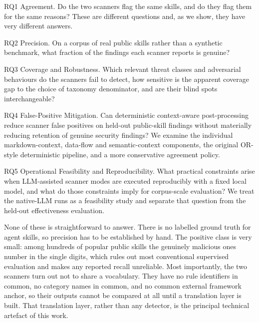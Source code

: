 \documentclass[conference]{IEEEtran}
\begin{document}
RQ1 Agreement. Do the two scanners flag the same skills, and do they flag them for the same reasons? These are different questions and, as we show, they have very different answers.

RQ2 Precision. On a corpus of real public skills rather than a synthetic benchmark, what fraction of the findings each scanner reports is genuine?

RQ3 Coverage and Robustness. Which relevant threat classes and adversarial behaviours do the scanners fail to detect, how sensitive is the apparent coverage gap to the choice of taxonomy denominator, and are their blind spots interchangeable?

RQ4 False-Positive Mitigation. Can deterministic context-aware post-processing reduce scanner false positives on held-out public-skill findings without materially reducing retention of genuine security findings? We examine the individual markdown-context, data-flow and semantic-context components, the original OR-style deterministic pipeline, and a more conservative agreement policy.

RQ5 Operational Feasibility and Reproducibility. What practical constraints arise when LLM-assisted scanner modes are executed reproducibly with a fixed local model, and what do those constraints imply for corpus-scale evaluation? We treat the native-LLM runs as a feasibility study and separate that question from the held-out effectiveness evaluation.

None of these is straightforward to answer. There is no labelled ground truth for agent skills, so precision has to be established by hand. The positive class is very small: among hundreds of popular public skills the genuinely malicious ones number in the single digits, which rules out most conventional supervised evaluation and makes any reported recall unreliable. Most importantly, the two scanners turn out not to share a vocabulary. They have no rule identifiers in common, no category names in common, and no common external framework anchor, so their outputs cannot be compared at all until a translation layer is built. That translation layer, rather than any detector, is the principal technical artefact of this work.
\end{document}
